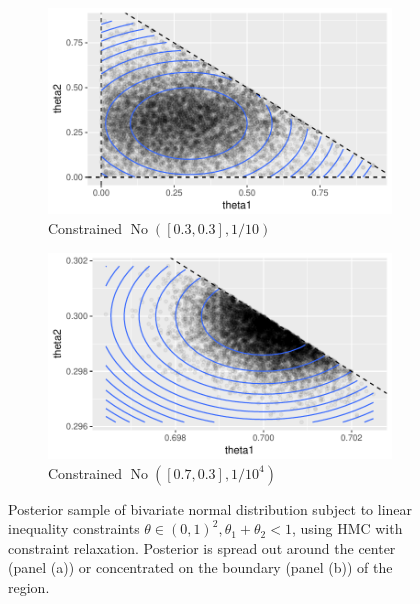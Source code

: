 \documentclass[10pt]{article}
\DeclareMathOperator{\No}{No}
\DeclareMathOperator{\1}{\mathbbm{1}}
\begin{document}
\begin{figure}[H]
\begin{subfigure}[b]{0.45\textwidth}
\includegraphics[width=1\textwidth]{linear_inequal_1}
\caption{Constrained $\No([0.3,0.3],1/{10})$}
\end{subfigure}
\begin{subfigure}[b]{0.45\textwidth}
\includegraphics[width=1\textwidth]{linear_inequal_2}
\caption{Constrained $\No([0.7,0.3],1/{10^4})$}
\end{subfigure}
\caption{Posterior sample of bivariate normal distribution subject to linear inequality constraints $\theta\in(0,1)^2,\theta_1+\theta_2<1$, using HMC with  constraint relaxation. Posterior is spread out around the center (panel (a)) or concentrated on the boundary (panel (b)) of the region.}
\label{linear_inequality}
\end{figure}
\end{document}
